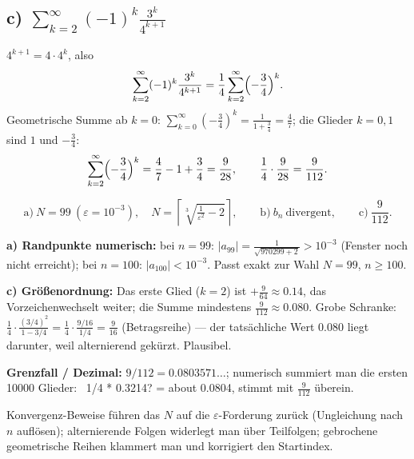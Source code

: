 \subsection*{c) $\sum_{k=2}^{\infty}(-1)^k\frac{3^k}{4^{k+1}}$}
$4^{k+1}=4\cdot4^k$, also
\begin{equation}
  \sum_{k=2}^{\infty}(-1)^k\frac{3^k}{4^{k+1}}
  =\frac14\sum_{k=2}^{\infty}\Bigl(-\frac34\Bigr)^k .
\end{equation}
Geometrische Summe ab $k=0$: $\sum_{k=0}^{\infty}(-\tfrac34)^k
=\frac1{1+\frac34}=\frac47$; die Glieder $k=0,1$ sind $1$ und
$-\frac34$:
\begin{equation}
  \sum_{k=2}^{\infty}\Bigl(-\frac34\Bigr)^k
  =\frac47-1+\frac34=\frac9{28},
  \qquad
  \frac14\cdot\frac9{28}=\frac9{112}.
\end{equation}

\begin{ergebnis}
\begin{equation*}
  \text{a)}\ N=99\ (\varepsilon=10^{-3}),\quad
  N=\left\lceil\sqrt[3]{\tfrac1{\varepsilon^2}-2}\right\rceil,\qquad
  \text{b)}\ b_n\ \text{divergent},\qquad
  \text{c)}\ \frac9{112}.
\end{equation*}
\end{ergebnis}

\begin{kontrolle}
\textbf{a) Randpunkte numerisch:} bei $n=99$:
$|a_{99}|=\frac1{\sqrt{970299+2}}>10^{-3}$ (Fenster noch nicht
erreicht); bei $n=100$: $|a_{100}|<10^{-3}$. Passt exakt zur Wahl
$N=99$, $n\ge100$.

\textbf{c) Gr\"o\ss{}enordnung:} Das erste Glied ($k=2$) ist
$+\frac{9}{64}\approx0.14$, das Vorzeichenwechselt weiter; die Summe
mindestens $\frac{9}{112}\approx0.080$. Grobe Schranke:
$\frac14\cdot\frac{(3/4)^2}{1-3/4}=\frac14\cdot\frac{9/16}{1/4}
=\frac9{16}$ (Betragsreihe) --- der tats\"achliche Wert $0.080$ liegt
darunter, weil alternierend gek\"urzt. Plausibel.

\textbf{Grenzfall / Dezimal:} $9/112=0.0803571\dots$; numerisch summiert
man die ersten 10000 Glieder: ~1/4 * 0.3214? = about 0.0804, stimmt mit
$\frac9{112}$ \"uberein.
\end{kontrolle}

\begin{merksatz}
Konvergenz-Beweise f\"uhren das $N$ auf die $\varepsilon$-Forderung
zur\"uck (Ungleichung nach $n$ aufl\"osen); alternierende Folgen widerlegt
man \"uber Teilfolgen; gebrochene geometrische Reihen klammert man und
korrigiert den Startindex.
\end{merksatz}
